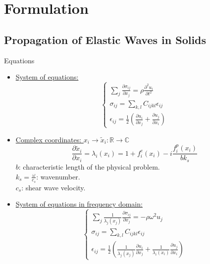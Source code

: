 \section{Formulation}
\subsection{Propagation of Elastic Waves in Solids}
\begin{frame}{Equations}
\begin{itemize}
\item \underline{System of equations:}
\begin{equation}
\begin{cases}
\sum_{j}\frac{\partial \sigma_{ij}}{\partial x_j} = \rho \frac{\partial^2 u_i}{\partial t^2} \\
\sigma_{ij} = \sum_{k,l} C_{ijkl} \epsilon_{ij} \\
\epsilon_{ij} = \frac{1}{2}\left(\frac{\partial u_i}{\partial x_j} + \frac{\partial u_j}{\partial x_i} \right)
\end{cases}
\end{equation}
\item \underline{Complex coordinates: $x_i \rightarrow \tilde{x}_i: \mathbb{R} \rightarrow \mathbb{C}$}
\begin{equation}
\frac{\partial \tilde{x}_i}{\partial x_i} = \lambda_i(x_i) = 1+f_i^e(x_i)-i \frac{f^p_i(x_i)}{b k_s}
\end{equation}
$b$: characteristic length of the physical problem.\\
$k_s = \frac{\omega}{c_s}$: wavenumber.\\
$c_s$: shear wave velocity.
 \end{itemize}
\end{frame}
\begin{frame}
\begin{itemize}
\item \underline{System of equations in frequency domain:}
\begin{equation}
\begin{cases}
\sum_{j} \frac{1}{\lambda_j(x_j)}\frac{\partial \sigma_{ij}}{\partial x_j} = -\rho \omega^2 u_j \\
\sigma_{ij} = \sum_{k,l} C_{ijkl} \epsilon_{ij} \\
\epsilon_{ij} = \frac{1}{2}\left(\frac{1}{\lambda_j(x_j)} \frac{\partial u_i}{\partial x_j} + \frac{1}{\lambda_i(x_i)} \frac{\partial u_j}{\partial x_i} \right)
\end{cases}
\end{equation}

\end{itemize}
\end{frame}


